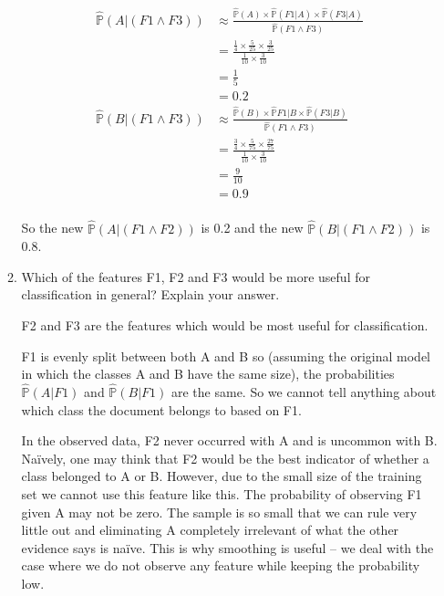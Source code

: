 \documentclass[10pt,\jkfside,a4paper]{article}
\begin{document}
\begin{enumerate}
\begin{enumerate}
\begin{equation}
\begin{split}
\hat{\mathds{P}}(A|(F1\wedge F3)) &\approx \frac{\hat{\mathds{P}}(A) \times \hat{\mathds{P}}(F1|A) \times \hat{\mathds{P}}(F3|A)}{\hat{\mathds{P}}(F1\wedge F3)}\\
							&= \frac{\frac{1}{4} \times \frac{5}{25} \times \frac{3}{25}}{\frac{1}{10}\times \frac{3}{10}}\\
							&= \frac{1}{5}\\
							&= 0.2\\
\hat{\mathds{P}}(B|(F1\wedge F3)) &\approx \frac{\hat{\mathds{P}}(B) \times \hat{\mathds{P}}{F1|B} \times \hat{\mathds{P}}(F3|B)}{\hat{\mathds{P}}(F1\wedge F3)}\\
							&= \frac{\frac{3}{4} \times \frac{5}{75} \times \frac{27}{75}}{\frac{1}{10}\times \frac{3}{10}}\\
							&= \frac{9}{10}\\
							&= 0.9\\
\end{split}
\end{equation}

So the new $\hat{\mathds{P}}(A|(F1 \wedge F2))$ is 0.2 and the new $\hat{\mathds{P}}(B|(F1 \wedge F2))$ is 0.8.

\item Which of the features F1, F2 and F3 would be more useful for classification
in general? Explain your answer.

F2 and F3 are the features which would be most useful for classification.

F1 is evenly split between both A and B so (assuming the original model in which the classes A and B have the same size), 
the probabilities $\hat{\mathds{P}}(A|F1)$ and $\hat{\mathds{P}}(B|F1)$ are the same. So we cannot tell anything about 
which class the document belongs to based on F1.

In the observed data, F2 never occurred with A and is uncommon with B. Na\"ively, one may think that F2 would be the best 
indicator of whether a class belonged to A or B. However, due to the small size of the training set we cannot use this 
feature like this. The probability of observing F1 given A may not be zero. The sample is so small that we can rule 
very little out and eliminating A completely irrelevant of what the other evidence says is na\"ive. This is why smoothing 
is useful -- we deal with the case where we do not observe any feature while keeping the probability low.


\end{enumerate}
\end{enumerate}
\end{document}
